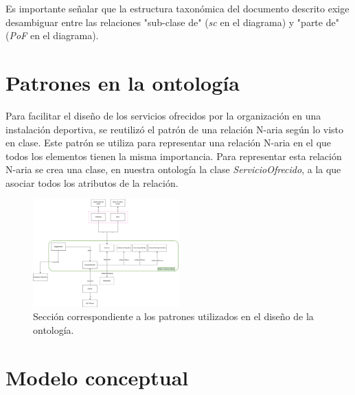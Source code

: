 \documentclass[a4paper,12pt]{article}
\begin{document}
	Es importante señalar que la estructura taxonómica del documento descrito exige desambiguar entre las relaciones "sub-clase de" (\textit{sc} en el diagrama) y "parte de" (\textit{PoF} en el diagrama).
	
	\section{Patrones en la ontología}
	
	Para facilitar el diseño de los servicios ofrecidos por la organización en una instalación deportiva, se reutilizó el patrón de una relación N-aria según lo visto en clase. Este patrón se utiliza para representar una relación N-aria en el que todos los elementos tienen la misma importancia. Para representar esta relación N-aria se crea una clase, en nuestra ontología la clase \textit{ServicioOfrecido}, a la que asociar todos los atributos de la relación.
	
	\begin{figure}[H]
		\centering
		\includegraphics[width=0.5\textwidth]{include/patron.png}
		\caption{Sección correspondiente a los patrones utilizados en el diseño de la ontología.}
	\end{figure}
	
	
	\section{Modelo conceptual}
	
\end{document}
